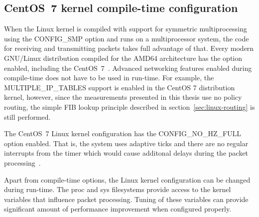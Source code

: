 \subsection{CentOS~7 kernel compile-time configuration}
When the Linux kernel is compiled with support for symmetric multiprocessing
using the CONFIG\_SMP option and runs on a multiprocessor system, the code for receiving and
transmitting packets takes full advantage of that.
Every modern GNU/Linux distribution compiled for the AMD64 architecture has the option enabled,
including the CentOS~7~\cite{understanding-internals}.
Advanced networking features enabled during compile-time
does not have to be used in run-time.
For example, the MULTIPLE\_IP\_TABLES support is enabled in the CentOS 7 distribution kernel, however,
since the measurements presented in this thesis use no policy routing,
the simple FIB lookup principle described in section~\ref{sec:linux-routing} is still performed.

The CentOS~7 Linux kernel configuration has the CONFIG\_NO\_HZ\_FULL option enabled.
That is, the system uses adaptive ticks
and there are no regular interrupts from the timer
which would cause additonal delays during the packet processing~\cite{kernel-doc-nohz}.

Apart from compile-time options, the Linux kernel configuration can be changed during run-time.
The proc and sys filesystems provide access to the kernel variables that influence packet processing.
Tuning of these variables can provide significant amount of performance improvement when configured properly.







